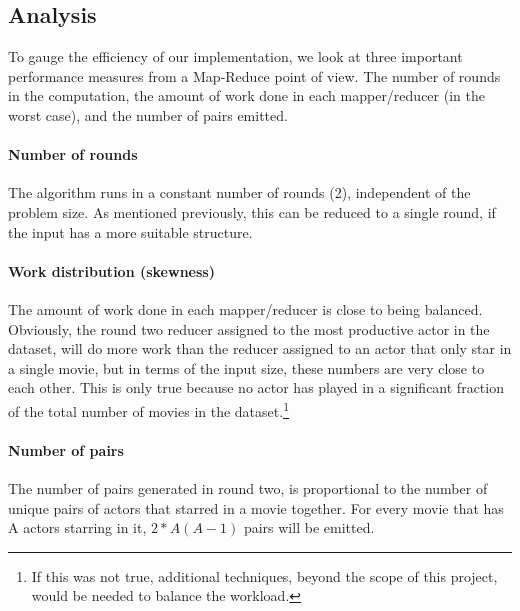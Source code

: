 \documentclass[a4paper,11pt]{article}
\begin{document}
\subsection{Analysis}
To gauge the efficiency of our implementation, we look at three important performance measures from a Map-Reduce point of view. The number of rounds in the computation, the amount of work done in each mapper/reducer (in the worst case), and the number of pairs emitted.

\paragraph{Number of rounds}
The algorithm runs in a constant number of rounds (2), independent of the problem size. As mentioned previously, this can be reduced to a single round, if the input has a more suitable structure.

\paragraph{Work distribution (skewness)}
The amount of work done in each mapper/reducer is close to being balanced. Obviously, the round two reducer assigned to the most productive actor in the dataset, will do more work than the reducer assigned to an actor that only star in a single movie, but in terms of the input size, these numbers are very close to each other. This is only true because no actor has played in a significant fraction of the total number of movies in the dataset.\footnote{If this was not true, additional techniques, beyond the scope of this project, would be needed to balance the workload.} 

\paragraph{Number of pairs}
The number of pairs generated in round two, is proportional to the number of unique pairs of actors that starred in a movie together. For every movie that has A actors starring in it, $2*A(A-1)$ pairs will be emitted. %
\end{document}
